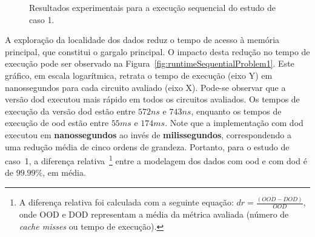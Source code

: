 \begin{figure}[h!b]
    \centering
    \caption{Resultados experimentais para a execução sequencial do estudo de caso 1.}
    \label{fig:problem1resultSequencial}
\end{figure}


A exploração da localidade dos dados reduz o tempo de acesso à memória principal, que constitui o gargalo principal. O impacto desta redução no tempo de execução pode ser observado na Figura~\ref{fig:runtimeSequentialProblem1}. Este gráfico, em escala logarítmica, retrata o tempo de execução (eixo Y) em nanossegundos para cada circuito avaliado (eixo X). Pode-se observar que a versão \ac{dod} executou mais rápido em todos os circuitos avaliados. Os tempos de execução da versão \ac{dod} estão entre $572ns$ e $743ns$, enquanto os tempos de execução de \ac{ood} estão entre $55ms$ e $174ms$.
Note que a implementação com \ac{dod} executou em \textbf{nanossegundos} ao invés de \textbf{milissegundos}, correspondendo a uma redução média de cinco ordens de grandeza.
Portanto, para o estudo de caso~1, a diferença relativa~\footnote{A diferença relativa foi calculada com a seguinte equação: $dr = \frac{(OOD - DOD)}{OOD}$, onde OOD e DOD representam a média da métrica avaliada (número de  \textit{cache misses} ou tempo de execução).} entre a modelagem dos dados com \ac{ood} e com \ac{dod} é de $99.99\%$, em média.

